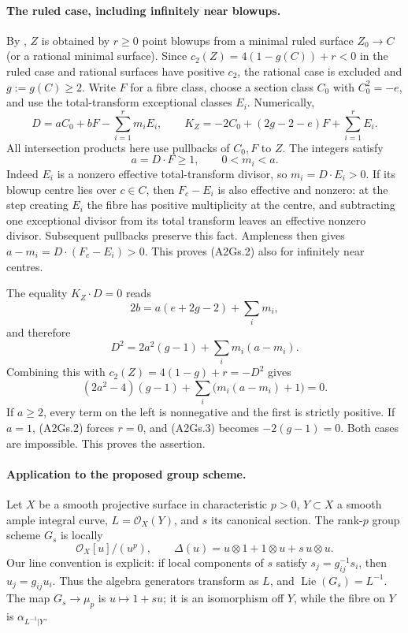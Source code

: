 \paragraph{The ruled case, including infinitely near blowups.}
By \cite[Theorems 4.4--4.5, p.~21]{DGJ_LiedtkeSurfaces2013}, $Z$
is obtained by $r\geq0$ point blowups from a minimal ruled surface
$Z_0\to C$ (or a rational minimal surface). Since
$c_2(Z)=4(1-g(C))+r<0$ in the ruled case and rational surfaces have
positive $c_2$, the rational case is excluded and $g:=g(C)\geq2$.
Write $F$ for a fibre class, choose a section class $C_0$ with
$C_0^2=-e$, and use the total-transform exceptional classes $E_i$.
Numerically,
\[
 D=aC_0+bF-\sum_{i=1}^r m_iE_i,\qquad
 K_Z=-2C_0+(2g-2-e)F+\sum_{i=1}^r E_i.
\]
All intersection products here use pullbacks of $C_0,F$ to $Z$.
The integers satisfy
\[
 a=D\cdot F\geq1,\qquad 0<m_i<a.                 \tag{A2Gs.2}
\]
Indeed $E_i$ is a nonzero effective total-transform divisor, so
$m_i=D\cdot E_i>0$. If its blowup centre lies over $c\in C$, then
$F_c-E_i$ is also effective and nonzero: at the step creating $E_i$
the fibre has positive multiplicity at the centre, and subtracting
one exceptional divisor from its total transform leaves an effective
nonzero divisor. Subsequent pullbacks preserve this fact. Ampleness
then gives $a-m_i=D\cdot(F_c-E_i)>0$. This proves (A2Gs.2) also for
infinitely near centres.

The equality $K_Z\cdot D=0$ reads
\[
 2b=a(e+2g-2)+\sum_i m_i,
\]
and therefore
\[
 D^2=2a^2(g-1)+\sum_i m_i(a-m_i).
\]
Combining this with $c_2(Z)=4(1-g)+r=-D^2$ gives
\[
 (2a^2-4)(g-1)+\sum_i\bigl(m_i(a-m_i)+1\bigr)=0. \tag{A2Gs.3}
\]
If $a\geq2$, every term on the left is nonnegative and the first
is strictly positive. If $a=1$, (A2Gs.2) forces $r=0$, and (A2Gs.3)
becomes $-2(g-1)=0$. Both cases are impossible. This proves the assertion.

\paragraph{Application to the proposed group scheme.}
Let $X$ be a smooth projective surface in characteristic $p>0$,
$Y\subset X$ a smooth ample integral curve, $L=\mathcal O_X(Y)$,
and $s$ its canonical section. The rank-$p$ group scheme $G_s$ is
locally
\[
 \mathcal O_X[u]/(u^p),\qquad
 \Delta(u)=u\otimes1+1\otimes u+s\,u\otimes u.
\]
Our line convention is explicit: if local components of $s$ satisfy
$s_j=g_{ij}^{-1}s_i$, then $u_j=g_{ij}u_i$. Thus the algebra
generators transform as $L$, and $\operatorname{Lie}(G_s)=L^{-1}$.
The map $G_s\to\mu_p$ is $u\mapsto1+su$; it is an isomorphism
off $Y$, while the fibre on $Y$ is $\alpha_{L^{-1}|Y}$.

